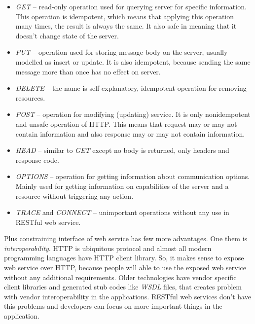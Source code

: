 \documentclass[12pt,final,oneside]{fithesis2}
\begin{document}
\begin{itemize}
\item
\textit{GET} -- read-only operation used for querying server for specific information. This operation is idempotent, which means that applying this operation many times, the result is always the same. It also safe in meaning that it doesn't change state of the server.

\item
\textit{PUT} -- operation used for storing message body on the server, usually modelled as insert or update. It is also idempotent, because sending the same message more than once has no effect on server.

\item
\textit{DELETE} -- the name is self explanatory, idempotent operation for removing resources.

\item
\textit{POST} -- operation for modifying (updating) service. It is only nonidempotent and unsafe operation of HTTP. This means that request may or may not contain information and also response may or may not contain information.

\item
\textit{HEAD} -- similar to \textit{GET} except no body is returned, only headers and response code.

\item
\textit{OPTIONS} -- operation for getting information about communication options. Mainly used for getting information on capabilities of the server and a resource without triggering any action.

\item
\textit{TRACE} and \textit{CONNECT} -- unimportant operations without any use in RESTful web service.
\end{itemize}

Plus constraining interface of web service has few more advantages. One them is \textit{interoperability}. HTTP is ubiquitous protocol and almost all modern programming languages have HTTP client library. So, it makes sense to expose web service over HTTP, because people will able to use the exposed web service without any additional requirements. Older technologies have vendor specific client libraries and generated stub codes like \textit{WSDL} files, that creates problem with vendor interoperability in the applications. RESTful web services don't have this problems and developers can focus on more important things in the application.
\end{document}
